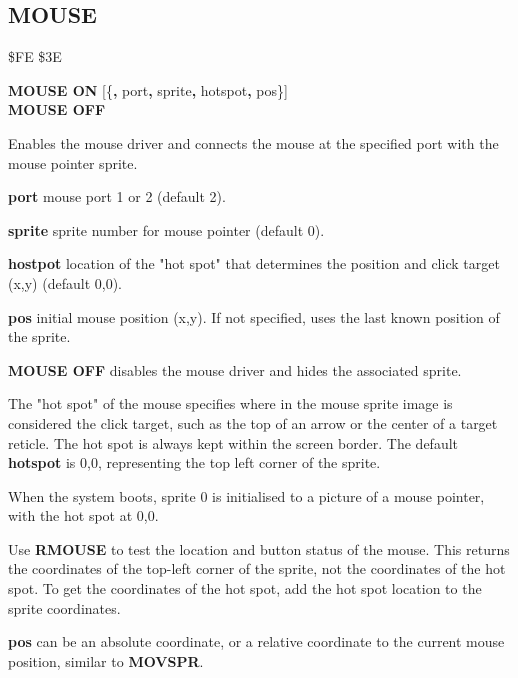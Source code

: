 \subsection{MOUSE}
\begin{description}[leftmargin=2cm,style=nextline]
\item [Token:] \$FE \$3E
\item [Format:] {\bf MOUSE ON} [\{{\bf,} port{\bf,} sprite{\bf,} hotspot{\bf,} pos\}] \\
                {\bf MOUSE OFF}
\item [Usage:]  Enables the mouse driver
                and connects the mouse at the specified port
                with the mouse pointer sprite.

                {\bf port} mouse port 1 or 2 (default 2).

                {\bf sprite} sprite number for mouse pointer (default 0).

                {\bf hostpot} location of the "hot spot" that determines the position
                and click target (x,y) (default 0,0).

                {\bf pos} initial mouse position (x,y). If not specified, uses the
                last known position of the sprite.

                {\bf MOUSE OFF} disables the mouse
                driver and hides the associated sprite.

\item [Remarks:] The "hot spot" of the mouse specifies where in the mouse
                sprite image is considered the click target, such as the top
                of an arrow or the center of a target reticle. The hot spot is
                always kept within the screen border. The default
                {\bf hotspot} is 0,0, representing the top left corner of the
                sprite.

                When the system boots, sprite 0 is initialised to a picture of
                a mouse pointer, with the hot spot at 0,0.

                Use {\bf RMOUSE} to test the location and button status of
                the mouse. This returns the coordinates of the top-left corner
                of the sprite, not the coordinates of the hot spot. To get the
                coordinates of the hot spot, add the hot spot location to the
                sprite coordinates.

                {\bf pos} can be an absolute coordinate, or a relative coordinate
                to the current mouse position, similar to {\bf MOVSPR}.


\end{description}
